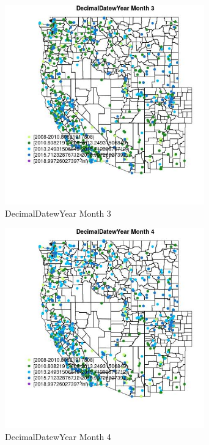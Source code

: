 \begin{figure} 
\centering  
\includegraphics[width=0.77\textwidth]{Code_Outputs/Report_ML_input_PM25_Step4_part_e_de_duplicated_aveswNAs_MapObsMo3DecimalDatewYear.jpg} 
\caption{\label{fig:Report_ML_input_PM25_Step4_part_e_de_duplicated_aveswNAsMapObsMo3DecimalDatewYear}DecimalDatewYear Month 3} 
\end{figure} 
 

\begin{figure} 
\centering  
\includegraphics[width=0.77\textwidth]{Code_Outputs/Report_ML_input_PM25_Step4_part_e_de_duplicated_aveswNAs_MapObsMo4DecimalDatewYear.jpg} 
\caption{\label{fig:Report_ML_input_PM25_Step4_part_e_de_duplicated_aveswNAsMapObsMo4DecimalDatewYear}DecimalDatewYear Month 4} 
\end{figure} 
 

